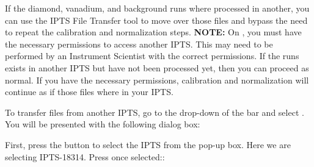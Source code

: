 If the diamond, vanadium, and background runs where processed in another, you can use the IPTS File Transfer tool to move over those files and bypass the need to repeat the calibration and normalization steps. \textbf{NOTE:} On \analysis, you must have the necessary permissions to access another IPTS. This may need to be performed by an Instrument Scientist with the correct permissions. If the runs exists in another IPTS but have not been processed yet, then you can proceed as normal. If you have the necessary permissions, calibration and normalization will continue as if those files where in your IPTS.

To transfer files from another IPTS, go to the  drop-down of the  bar and select . You will be presented with the following dialog box:

  \noindent{}
  
First, press the  button to select the IPTS from the pop-up box. Here we are selecting IPTS-18314. Press  once selected::

  \noindent{}
  
